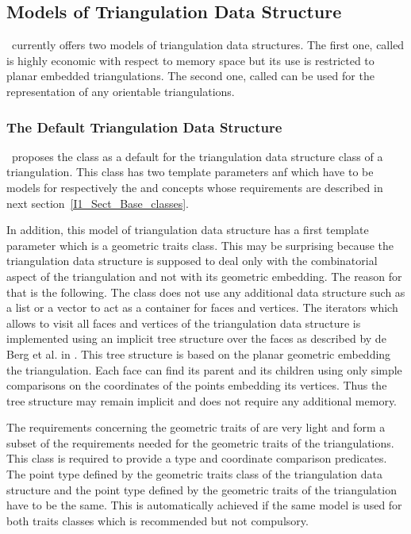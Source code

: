 \subsection{Models of Triangulation Data Structure}
\cgal\ currently offers  two models of triangulation data structures.
The first one, called 
is highly economic with respect to memory space but its use is
restricted
to planar embedded triangulations. The second one, called
 can be used for 
the representation of any  orientable triangulations.

\subsubsection{The Default Triangulation Data Structure}
\cgal\ proposes the class 
as a default for the triangulation data structure class of a triangulation.
This class has two template parameters  anf 
which have 
to be models for respectively the
 and  concepts whose requirements are described in next 
section~\ref{I1_Sect_Base_classes}. 

In addition, this model of triangulation data structure has a first template parameter
which is a geometric traits class. This may be surprising because
the triangulation data structure is supposed to deal only with the combinatorial
aspect of the triangulation and not with its geometric embedding.
The reason for that is the following.
The class 
does not use any additional data structure
such as a list or a vector to act as a container for faces and vertices.
The iterators which allows to visit all faces and vertices of the
triangulation
data structure
is implemented using  an implicit tree structure over the faces
as described by
 de Berg et al. in  \cite{bkoo-stses-97}.
 This tree structure is  based on the planar
geometric embedding
the triangulation. Each face 
 can find its parent 
and its children using only simple comparisons on the
coordinates of the points embedding its vertices.
Thus the tree structure may remain implicit 
and does not require any additional memory. 

The requirements concerning the geometric traits  of
 are very light and form a subset of the requirements needed
for the geometric traits of the triangulations. 
This class is required  to provide a type 
and coordinate comparison predicates.
The point type
defined by the geometric traits class of the triangulation data
structure
and the point type defined by the geometric traits of the triangulation
have to be the same.
This is automatically achieved if the same model is used for both
traits classes which is recommended but not compulsory.




